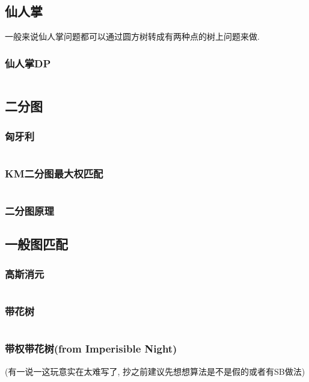 \documentclass[a4paper, twoside]{article}
\begin{document}
\begin{multicols}{2}
			\subsection{仙人掌}
				一般来说仙人掌问题都可以通过圆方树转成有两种点的树上问题来做.
				\subsubsection{仙人掌DP}
					\inputminted{cpp}{../src/graph/仙人掌DP.cpp}
			
			\subsection{二分图}
				\subsubsection{匈牙利}
					\inputminted{cpp}{../src/graph/hungary.cpp}



				\subsubsection{KM二分图最大权匹配}
					\inputminted{cpp}{../src/graph/KM二分图最大权匹配.cpp}

				\subsubsection{二分图原理}
					
			
			\subsection{一般图匹配}
				\subsubsection{高斯消元}
					\inputminted{cpp}{../src/graph/基于线性代数的一般图匹配.cpp}

				\subsubsection{带花树}
					\inputminted{cpp}{../src/graph/带花树.cpp}
				
				\subsubsection{带权带花树(from Imperisible Night)}
					(有一说一这玩意实在太难写了, 抄之前建议先想想算法是不是假的或者有SB做法)
					\inputminted{cpp}{../src/graph/带权带花树.cpp}
				

\end{multicols}
\end{document}
